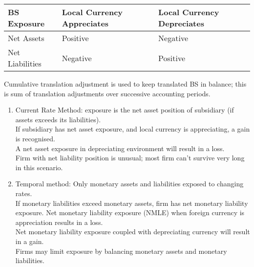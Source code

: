 \begin{remark} 
\begin{flushleft}
\begin{tabularx}{\textwidth}{p{10em}|X|X}
\hline
\rowcolor{gray!30}
BS Exposure & Local Currency Appreciates & Local Currency Depreciates \\
\hline
Net Assets & Positive & Negative \\
\hline
Net Liabilities & Negative & Positive \\
\hline
\end{tabularx}
Cumulative translation adjustment is used to keep translated BS in balance; this is sum of translation adjustments over successive accounting periods.
\end{flushleft}
\end{remark}

\begin{remark} 
\begin{enumerate}[label=\roman*.]
\setlength{\itemsep}{0pt}
\item Current Rate Method: exposure is the net asset position of subsidiary (if assets exceeds its liabilities).\\
If subsidiary has net asset exposure, and local currency is appreciating, a gain is recognised.\\
A net asset exposure in depreciating environment will result in a loss.\\
Firm with net liability position is unusual; most firm can't survive very long in this scenario.
\item Temporal method: Only monetary assets and liabilities exposed to changing rates.\\
If monetary liabilities exceed monetary assets, firm has net monetary liability exposure.
Net monetary liability exposure (NMLE) when foreign currency is appreciation results in a loss.\\
Net monetary liability exposure coupled with depreciating currency will result in a gain.\\
Firms may limit exposure by balancing monetary assets and monetary liabilities.
\end{enumerate}
\end{remark}

